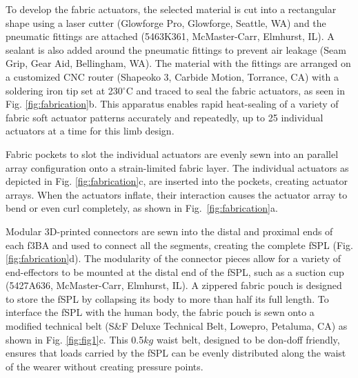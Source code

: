 \documentclass[letterpaper, 10 pt, conference]{ieeeconf}  %
\begin{document}
To develop the fabric actuators, the selected material is cut into a rectangular shape using a laser cutter (Glowforge Pro, Glowforge, Seattle, WA) and the pneumatic fittings are attached (5463K361, McMaster-Carr, Elmhurst, IL). A sealant is also added around the pneumatic fittings to prevent air leakage (Seam Grip, Gear Aid, Bellingham, WA). The material with the fittings are arranged on a customized CNC router (Shapeoko 3, Carbide Motion, Torrance, CA) with a soldering iron tip set at 230$^{\circ}$C and traced to seal the fabric actuators, as seen in Fig. \ref{fig:fabrication}b. This apparatus enables rapid heat-sealing of a variety of fabric soft actuator patterns accurately and repeatedly, up to 25 individual actuators at a time for this limb design. 

Fabric pockets to slot the individual actuators are evenly sewn into an parallel array configuration onto a strain-limited fabric layer. The individual actuators as depicted in Fig. \ref{fig:fabrication}c, are inserted into the pockets, creating actuator arrays. When the actuators inflate, their interaction causes the actuator array to bend or even curl completely, as shown in Fig.~\ref{fig:fabrication}a. 
% 




Modular 3D-printed connectors are sewn into the distal and proximal ends of each f3BA and used to connect all the segments, creating the complete fSPL (Fig. \ref{fig:fabrication}d). The modularity of the connector pieces allow for a variety of end-effectors to be mounted at the distal end of the fSPL, such as a suction cup (5427A636, McMaster-Carr, Elmhurst, IL). A zippered fabric pouch is designed to store the fSPL by collapsing its body to more than half its full length. To interface the fSPL with the human body, the fabric pouch is sewn onto a modified technical belt (S\&F Deluxe Technical Belt, Lowepro, Petaluma, CA) as shown in Fig. \ref{fig:fig1}c. This 0.5$kg$ waist belt, designed to be don-doff friendly, ensures that loads carried by the fSPL can be evenly distributed along the waist of the wearer without creating pressure points. 
\end{document}
